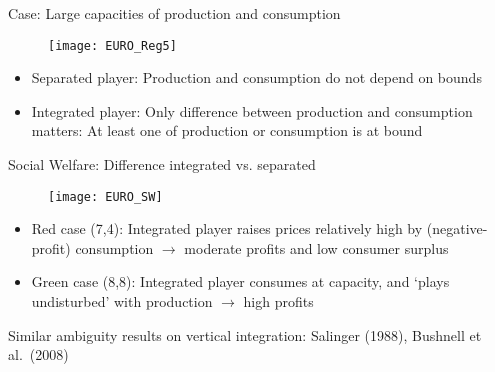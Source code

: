\documentclass[aspectratio=169,t]{beamer}  %
\begin{document}
\begin{frame}{Case: Large capacities of production and consumption}
\begin{figure}
    \texttt{[image: EURO\_Reg5]}
\end{figure}
\begin{itemize}
   \item Separated player: Production and consumption do not depend on bounds
    \item Integrated player: Only difference between production and consumption matters: At least one of production or consumption is at bound
\end{itemize}
\end{frame}



\begin{frame}{Social Welfare: Difference integrated vs. separated}
\begin{figure}
    \texttt{[image: EURO\_SW]}
\end{figure}
\begin{itemize}
   \item Red case (7,4): Integrated player raises prices relatively high by (negative-profit) consumption $\to$ moderate profits and low consumer surplus
   \item Green case (8,8): Integrated player consumes at capacity, and `plays undisturbed' with production $\to$ high profits
\end{itemize}
Similar ambiguity results on vertical integration: Salinger (1988), Bushnell et al.\ (2008)
\end{frame}
\end{document}
